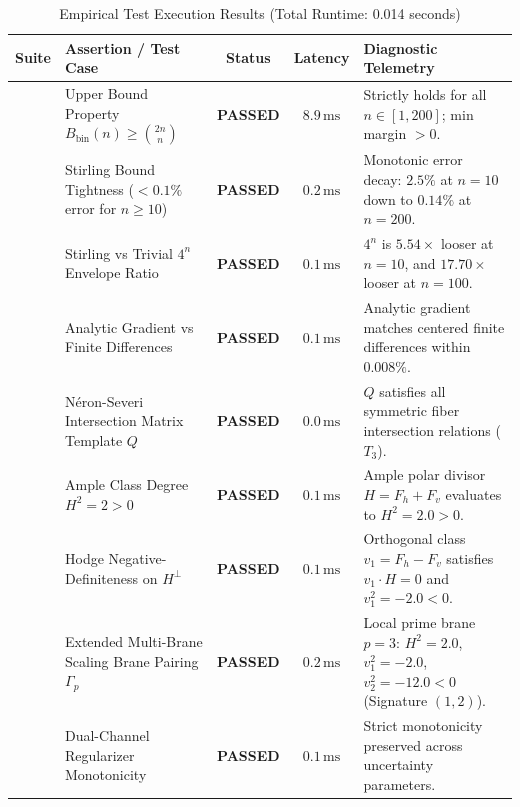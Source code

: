 \documentclass[11pt,a4paper]{article}
\theoremstyle{definition}
\theoremstyle{remark}
\begin{document}
\begin{table}[t]
\centering
\caption{Empirical Test Execution Results (Total Runtime: 0.014 seconds)}
\label{tab:empirical_tests}
\small
\begin{tabularx}{\textwidth}{llccp{7.5cm}}
\toprule
\textbf{Suite} & \textbf{Assertion / Test Case} & \textbf{Status} & \textbf{Latency} & \textbf{Diagnostic Telemetry} \\
\midrule
{} 
& Upper Bound Property $B_{\mathrm{bin}}(n) \ge \binom{2n}{n}$ & \textbf{PASSED} & $8.9\,\mathrm{ms}$ & Strictly holds for all $n \in [1, 200]$; min margin $> 0$. \\
& Stirling Bound Tightness ($<0.1\%$ error for $n \ge 10$) & \textbf{PASSED} & $0.2\,\mathrm{ms}$ & Monotonic error decay: $2.5\%$ at $n=10$ down to $0.14\%$ at $n=200$. \\
& Stirling vs Trivial $4^n$ Envelope Ratio & \textbf{PASSED} & $0.1\,\mathrm{ms}$ & $4^n$ is $5.54\times$ looser at $n=10$, and $17.70\times$ looser at $n=100$. \\
& Analytic Gradient vs Finite Differences & \textbf{PASSED} & $0.1\,\mathrm{ms}$ & Analytic gradient matches centered finite differences within $0.008\%$. \\
\midrule
{}
& N\'eron-Severi Intersection Matrix Template $Q$ & \textbf{PASSED} & $0.0\,\mathrm{ms}$ & $Q$ satisfies all symmetric fiber intersection relations ($T_3$). \\
& Ample Class Degree $H^2 = 2 > 0$ & \textbf{PASSED} & $0.1\,\mathrm{ms}$ & Ample polar divisor $H = F_h + F_v$ evaluates to $H^2 = 2.0 > 0$. \\
& Hodge Negative-Definiteness on $H^\perp$ & \textbf{PASSED} & $0.1\,\mathrm{ms}$ & Orthogonal class $v_1 = F_h - F_v$ satisfies $v_1 \cdot H = 0$ and $v_1^2 = -2.0 < 0$. \\
& Extended Multi-Brane Scaling Brane Pairing $\Gamma_p$ & \textbf{PASSED} & $0.2\,\mathrm{ms}$ & Local prime brane $p=3$: $H^2 = 2.0$, $v_1^2 = -2.0$, $v_2^2 = -12.0 < 0$ (Signature $(1, 2)$). \\
\midrule
{}
& Dual-Channel Regularizer Monotonicity & \textbf{PASSED} & $0.1\,\mathrm{ms}$ & Strict monotonicity preserved across uncertainty parameters. \\

\end{tabularx}
\end{table}
\end{document}
